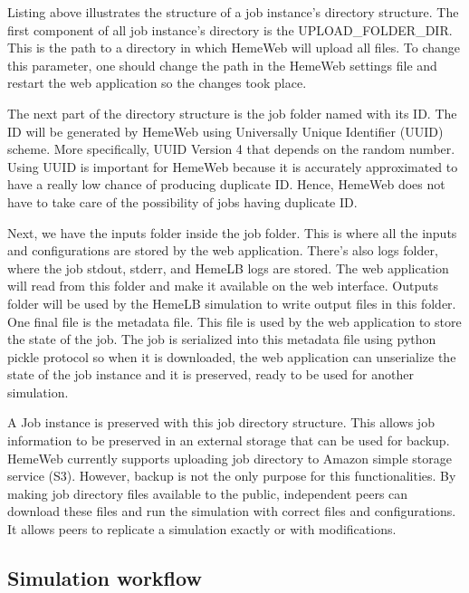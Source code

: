 Listing above illustrates the structure of a job instance's directory structure.  The first component of all job instance's directory is the UPLOAD\_FOLDER\_DIR. This is the path to a directory in which HemeWeb will upload all files. To change this parameter, one should change the path in the HemeWeb settings file and restart the web application so the changes took place.

The next part of the directory structure is the job folder named with its ID. The ID will be generated by HemeWeb using Universally Unique Identifier (UUID) scheme. More specifically, UUID Version 4 that depends on the random number. Using UUID is important for HemeWeb because it is accurately approximated to have a really low chance of producing duplicate ID. Hence, HemeWeb does not have to take care of the possibility of jobs having duplicate ID.

Next, we have the inputs folder inside the job folder. This is where all the inputs and configurations are stored by the web application. There's also logs folder, where the job stdout, stderr, and HemeLB logs are stored. The web application will read from this folder and make it available on the web interface. Outputs folder will be used by the HemeLB simulation to write output files in this folder. One final file is the metadata file. This file is used by the web application to store the state of the job. The job is serialized into this metadata file using python pickle protocol so when it is downloaded, the web application can unserialize the state of the job instance and it is preserved, ready to be used for another simulation.

A Job instance is preserved with this job directory structure. This allows job information to be preserved in an external storage that can be used for backup. HemeWeb currently supports uploading job directory to Amazon simple storage service (S3). However, backup is not the only purpose for this functionalities. By making job directory files available to the public, independent peers can download these files and run the simulation with correct files and configurations. It allows peers to replicate a simulation exactly or with modifications.

\subsection{Simulation workflow}

\vspace{1cm}

